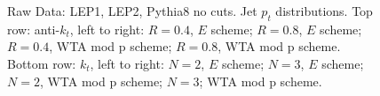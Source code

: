 \begin{figure}[H]
\hfill
{}\hfill
{}\hfill
\caption{Raw Data: LEP1, LEP2, Pythia8 no cuts. Jet $p_t$ distributions. Top row: anti-$k_t$, left to right: $R=0.4$, $E$ scheme; $R=0.8$, $E$ scheme; $R=0.4$, WTA mod p scheme; $R=0.8$, WTA mod p scheme. Bottom row: $k_t$, left to right: $N=2$, $E$ scheme; $N=3$, $E$ scheme; $N=2$, WTA mod p scheme; $N=3$; WTA mod p scheme.}  
\end{figure}

